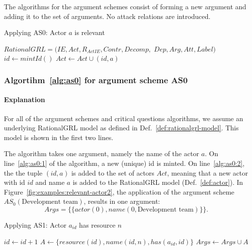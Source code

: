 The algorithms for the argument schemes consist of forming a new argument and adding it to the set of arguments. No attack relations are introduced.

\begin{algorithm}[h]
  \caption{Applying AS0: Actor $a$ is relevant}\label{alg:as0}
  \begin{algorithmic}[1]
    \State $RationalGRL=(IE, Act, R_{ActIE}, Contr, Decomp,$
    \State \qquad\qquad\qquad\qquad$Dep, Arg, Att, Label)$
    \State $id\gets mintId()$\label{alg:as0:1}
    \State $Act \gets Act \cup (id, a)$\label{alg:as0:2}
    \EndProcedure
  \end{algorithmic}
\end{algorithm}

\subsubsection{Algortihm~\ref{alg:as0} for argument scheme AS0}

\paragraph{Explanation} For all of the argument schemes and critical questions algorithms, we assume an underlying RationalGRL model as defined in Def.~\ref{def:rationalgrl-model}. This model is shown in the first two lines.

The algorithm takes one argument, namely the name of the actor $a$. On line~\ref{alg:as0:1} of the algorithm, a new (unique) id is minted. On line~\ref{alg:as0:2}, the the tuple $(id,a)$ is added to the set of actors $Act$, meaning that a new actor with id $id$ and name $a$ is added to the RationalGRL model (Def.~\ref{def:actor}). In Figure~\ref{fig:examples:relevant-actor2}, the application of the argument scheme $AS_0(\text{Development team})$, results in one argument: $$Args = \{\{actor(0), name(0, \text{Development team})\}\}.$$

\begin{algorithm}[h]
  \caption{Applying AS1: Actor $a_{id}$ has resource $n$}\label{alg:as1}
  \begin{algorithmic}[1]
    \State $id\gets id+1$
    \State $A\gets \{resource(id), name(id,n), has(a_{id},id)\}$
    \State $Args \gets Args\cup A$
    \EndProcedure
  \end{algorithmic}
\end{algorithm}

